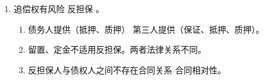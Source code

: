 \begin{enumerate}
\begin{enumerate}
\begin{enumerate}
\begin{enumerate}
                          \item 连带共同物保（）。\yi {}。\er 两个第三人的物保。
                        \end{enumerate}
                  \item {}（）。既有物的担保，又有人的担保。
                        \begin{enumerate}
                          \item 按份混合担保。
                          \item 连带混合担保。\yi 债务人的物保和保证并存。\er {}。。
                        \end{enumerate}
                \end{enumerate}
          \item 清偿顺序。
                \begin{enumerate}
                  \item {}（先找保证人不公平）。
                  \item {}，有约从约 \yjt {}按比例。。
                \end{enumerate}
          \item {}（）。原则不让互相追，尽可能找主债务人。
                \begin{enumerate}
                  \item {}。。
                  \item 知道（）。。
                        \begin{enumerate}
                          \item {}，自己承担自己的份额。
                          \item {}。有约从约，追偿无顺序 \yjt {} \yjt 不足部分找其他担保人按比例 \hz 平均分 \yjt 还有不足 \yjt 债务人。
                                。
                        \end{enumerate}
                \end{enumerate}
        \end{enumerate}
  \item 追偿权有风险 \yjt 反担保 \yjt {}。
        \begin{enumerate}
          \item 债务人提供（抵押、质押） \hz 第三人提供（保证、抵押、质押）。
          \item 留置、定金不适用反担保。两者法律关系不同。
          \item 反担保人与债权人之间不存在合同关系 \yjt 合同相对性。
        \end{enumerate}
\end{enumerate}
